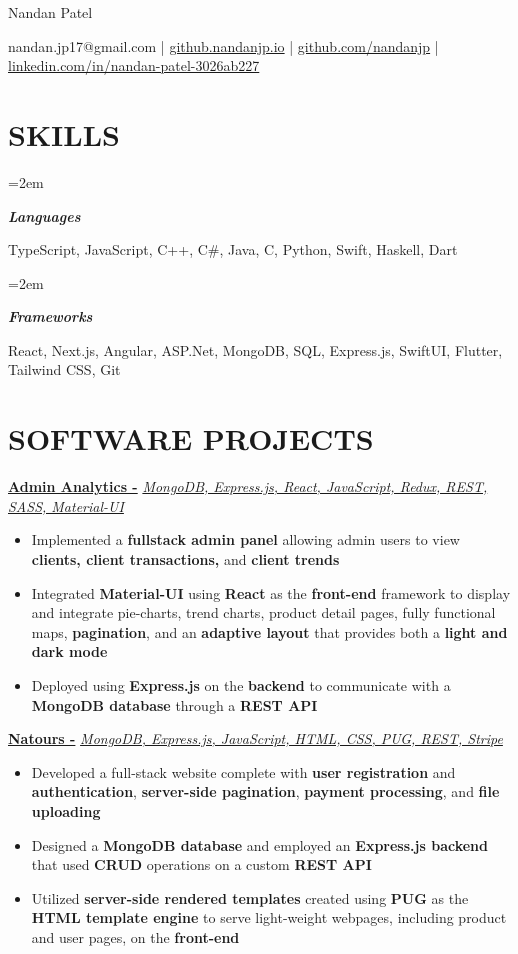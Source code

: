 \documentclass[10pt]{article}
\newlength{\spacebox}
\newcommand{\sepspace}{\vspace*{0.5em}}   %
\newcommand{\MyName}[1]{ %
    \huge \usefont{OT1}{phv}{b}{n} \hfill #1
    \par \normalsize \normalfont}
\newcommand{\NewPart}[1]{\section*{\uppercase{#1}}}
\newcommand{\PersonalEntry}[2]{
    \noindent\hangindent=2em\hangafter=0 %
    \parbox{\spacebox}{ \textit{#1}} \hspace{1.5em} #2 %
    \par}              %
\newcommand{\SkillsEntry}[2]{                %
    \noindent\hangindent=2em\hangafter=0 %
    \parbox{\spacebox}{ \textit{#1}} \hspace{1.5em} #2 %
    \par}              %
\newcommand{\EducationEntry}[4]{
    \noindent \textbf{#1} \hfill      %
    \colorbox{Black}{
        \parbox{8.5em}{ \hfill\color{White}#2}} \par  %
    \noindent \textit{#3} \par        %
    \noindent\hangindent=2em\hangafter=0 \small #4 %
    \normalsize \par}
\newcommand{\ProjectEntry}[4]{         %
    \noindent \textbf{#1} \noindent \textit{#3} \hfill {#2} \par
    \noindent \small #4 %
    \normalsize \par}
\begin{document}
\MyName{Nandan Patel}
\sepspace
{\small \hfill \faEnvelope \space nandan.jp17@gmail.com | \faLink \space \href{https://github.nandanjp.io}{github.nandanjp.io} | \faGithub \space\href{https://github.com/nandanjp}{github.com/nandanjp} | \faLinkedin \space\href{https://linkedin.com/in/nandan-patel-3026ab227}{linkedin.com/in/nandan-patel-3026ab227}
\NewPart{Skills}{}
\SkillsEntry
{\textbf{Languages}}
{TypeScript, JavaScript, C++, C\#, Java, C, Python, Swift, Haskell, Dart}
\SkillsEntry
{\textbf{Frameworks}}
{React, Next.js, Angular, ASP.Net, MongoDB, SQL, Express.js, SwiftUI, Flutter, Tailwind CSS, Git}
\NewPart{Software Projects}{}

\ProjectEntry
{\normalsize\href{https://github.com/nandanjp/Admin-Analytics}
    {Admin Analytics -}}{}
{\normalsize\href{https://github.com/nandanjp/Admin-Analytics}
    {MongoDB, Express.js, React, JavaScript, Redux, REST, SASS, Material-UI}}
{\begin{itemize} \itemsep -1pt
        \item Implemented a \textbf{fullstack admin panel} allowing admin users to view
              \textbf{clients, client transactions,} and \textbf{client trends}
        \item Integrated \textbf{Material-UI} using \textbf{React} as the \textbf{front-end}
              framework to display and integrate pie-charts, trend charts, product detail
              pages, fully functional maps, \textbf{pagination}, and an \textbf{adaptive
                  layout} that provides both a \textbf{light and dark mode}
        \item Deployed using \textbf{Express.js} on the \textbf{backend} to communicate with
              a \textbf{MongoDB database} through a \textbf{REST API}
    \end{itemize}
}

\ProjectEntry
{\normalsize\href{https://github.com/nandanjp/Natours/tree/main}
    {Natours -}}{}
{\normalsize\href{https://github.com/nandanjp/Natours/tree/main}
    {MongoDB, Express.js, JavaScript, HTML, CSS, PUG, REST, Stripe}}
{\begin{itemize} \itemsep -1pt
        \item Developed a full-stack website complete with \textbf{user registration} and
              \textbf{authentication}, \textbf{server-side pagination}, \textbf{payment
                  processing}, and \textbf{file uploading}
        \item Designed a \textbf{MongoDB database} and employed an \textbf{Express.js
                  backend} that used \textbf{CRUD} operations on a custom \textbf{REST API}
        \item Utilized \textbf{server-side rendered templates} created using \textbf{PUG} as
              the \textbf{HTML template engine} to serve light-weight webpages, including
              product and user pages, on the \textbf{front-end}
    \end{itemize}
}

}
\end{document}
